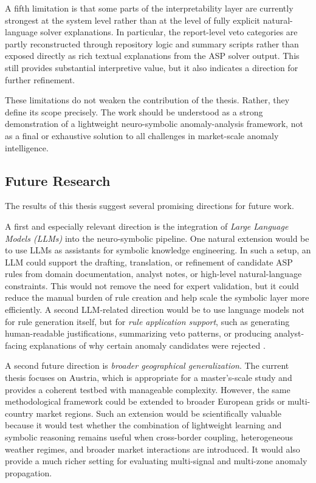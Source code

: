 A fifth limitation is that some parts of the interpretability layer are currently strongest at the system level rather than at the level of fully explicit natural-language solver explanations. In particular, the report-level veto categories are partly reconstructed through repository logic and summary scripts rather than exposed directly as rich textual explanations from the ASP solver output. This still provides substantial interpretive value, but it also indicates a direction for further refinement.

These limitations do not weaken the contribution of the thesis. Rather, they define its scope precisely. The work should be understood as a strong demonstration of a lightweight neuro-symbolic anomaly-analysis framework, not as a final or exhaustive solution to all challenges in market-scale anomaly intelligence.

\subsection{Future Research}
\label{subsec:future_research}

The results of this thesis suggest several promising directions for future work.

A first and especially relevant direction is the integration of \emph{Large Language Models (LLMs)} into the neuro-symbolic pipeline. One natural extension would be to use LLMs as assistants for symbolic knowledge engineering. In such a setup, an LLM could support the drafting, translation, or refinement of candidate ASP rules from domain documentation, analyst notes, or high-level natural-language constraints. This would not remove the need for expert validation, but it could reduce the manual burden of rule creation and help scale the symbolic layer more efficiently. A second LLM-related direction would be to use language models not for rule generation itself, but for \emph{rule application support}, such as generating human-readable justifications, summarizing veto patterns, or producing analyst-facing explanations of why certain anomaly candidates were rejected \cite{openai2023gpt4,brown2020language}.

A second future direction is \emph{broader geographical generalization}. The current thesis focuses on Austria, which is appropriate for a master's-scale study and provides a coherent testbed with manageable complexity. However, the same methodological framework could be extended to broader European grids or multi-country market regions. Such an extension would be scientifically valuable because it would test whether the combination of lightweight learning and symbolic reasoning remains useful when cross-border coupling, heterogeneous weather regimes, and broader market interactions are introduced. It would also provide a much richer setting for evaluating multi-signal and multi-zone anomaly propagation.

